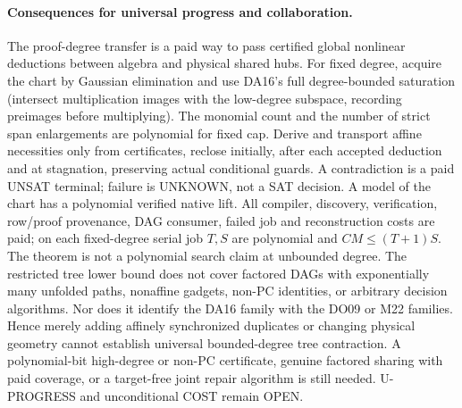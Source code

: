 \documentclass[11pt]{article}
\begin{document}
\paragraph{Consequences for universal progress and collaboration.}
The proof-degree transfer is a paid way to pass certified global nonlinear deductions between algebra and physical shared hubs. For fixed degree, acquire the chart by Gaussian elimination and use DA16's full degree-bounded saturation (intersect multiplication images with the low-degree subspace, recording preimages before multiplying). The monomial count and the number of strict span enlargements are polynomial for fixed cap. Derive and transport affine necessities only from certificates, reclose initially, after each accepted deduction and at stagnation, preserving actual conditional guards. A contradiction is a paid UNSAT terminal; failure is UNKNOWN, not a SAT decision. A model of the chart has a polynomial verified native lift. All compiler, discovery, verification, row/proof provenance, DAG consumer, failed job and reconstruction costs are paid; on each fixed-degree serial job $T,S$ are polynomial and $CM\le(T+1)S$. The theorem is not a polynomial search claim at unbounded degree. The restricted tree lower bound does not cover factored DAGs with exponentially many unfolded paths, nonaffine gadgets, non-PC identities, or arbitrary decision algorithms. Nor does it identify the DA16 family with the DO09 or M22 families. Hence merely adding affinely synchronized duplicates or changing physical geometry cannot establish universal bounded-degree tree contraction. A polynomial-bit high-degree or non-PC certificate, genuine factored sharing with paid coverage, or a target-free joint repair algorithm is still needed. U-PROGRESS and unconditional COST remain OPEN.
\end{document}
